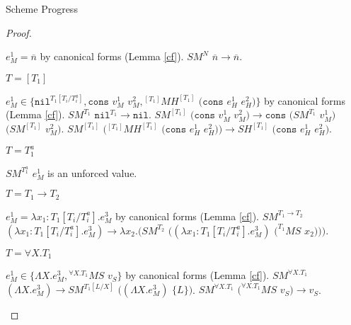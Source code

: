 \begin{theorem}{Scheme Progress}
\begin{proof}
\begin{case}
\begin{subcase}
$e_{M}^{1}=\overline{n}$ by canonical forms (Lemma \ref{cf}).  $SM^{N}$ $\overline{n}\rightarrow\overline{n}$.

\end{subcase}

\begin{subcase}

$T=[T_{1}]$

$e_{M}^{1}\in\lbrace\mathtt{nil}^{T_{1}[T_{i}/T_{i}^{a}]},\mathtt{cons}$ $v_{M}^{1}$ $v_{M}^{2},{^{[T_{1}]}M}H^{[T_{1}]}$ $(\mathtt{cons}$ $e_{H}^{1}$ $e_{H}^{2})\rbrace$ by canonical forms (Lemma \ref{cf}).  $SM^{T_{1}}$ $\mathtt{nil}^{T_{1}}\rightarrow\mathtt{nil}$.  $SM^{[T_{1}]}$ $(\mathtt{cons}$ $v_{M}^{1}$ $v_{M}^{2})\rightarrow\mathtt{cons}$ $(SM^{T_{1}}$ $v_{M}^{1})$ $(SM^{[T_{1}]}$ $v_{M}^{2})$.  $SM^{[T_{1}]}$ $({^{[T_{1}]}M}H^{[T_{1}]}$ $(\mathtt{cons}$ $e_{H}^{1}$ $e_{H}^{2}))\rightarrow SH^{[T_{1}]}$ $(\mathtt{cons}$ $e_{H}^{1}$ $e_{H}^{2})$.

\end{subcase}

\begin{subcase}

$T=T_{1}^{a}$

$SM^{T_{1}^{a}}$ $e_{M}^{1}$ is an unforced value.

\end{subcase}

\begin{subcase}

$T=T_{1}\rightarrow T_{2}$

$e_{M}^{1}=\lambda x_{1}:T_{1}[T_{i}/T_{i}^{a}].e_{M}^{3}$ by canonical forms (Lemma \ref{cf}).  $SM^{T_{1}\rightarrow T_{2}}$ $(\lambda x_{1}:T_{1}[T_{i}/T_{i}^{a}].e_{M}^{3})\rightarrow\lambda x_{2}.(SM^{T_{2}}$ $((\lambda x_{1}:T_{1}[T_{i}/T_{i}^{a}].e_{M}^{3})$ $(^{T_{1}}MS$ $x_{2})))$.

\end{subcase}

\begin{subcase}

$T=\forall X.T_{1}$

$e_{M}^{1}\in\lbrace\Lambda X.e_{M}^{3},{^{\forall X.T_{1}}M}S$ $v_{S}\rbrace$ by canonical forms (Lemma \ref{cf}).  $SM^{\forall X.T_{1}}$ $(\Lambda X.e_{M}^{3})\rightarrow SM^{T_{1}[L/X]}$ $((\Lambda X.e_{M}^{3})$ $\lbrace L\rbrace)$.  $SM^{\forall X.T_{1}}$ $(^{\forall X.T_{1}}MS$ $v_{S})\rightarrow v_{S}$.

\end{subcase}

\end{case}

\end{proof}

\end{theorem}

